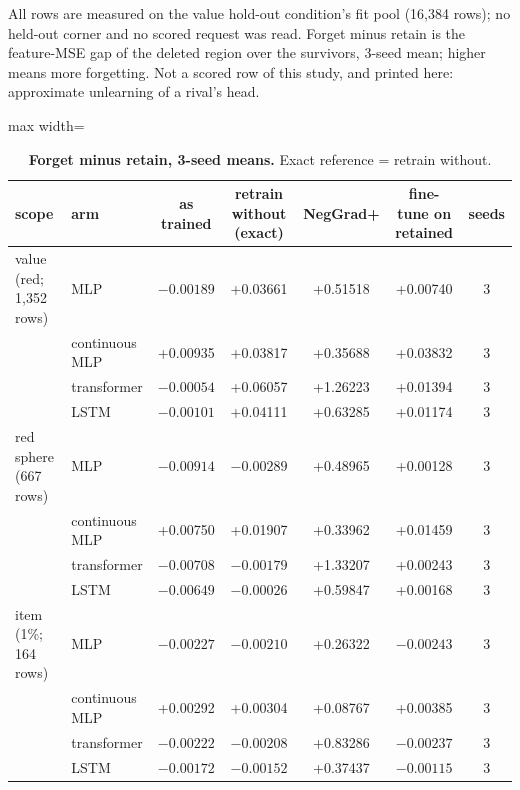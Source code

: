 \documentclass{article} %
\begin{document}
All rows are measured on the value hold-out condition's fit pool (16,384 rows); no held-out corner %
and no scored request was read. Forget minus retain is the feature-MSE gap of the deleted region
over the survivors, 3-seed mean; higher means more forgetting. Not a scored row of this study,
and printed here: approximate unlearning of a rival's head.

\begin{table}[h]
\centering\small
\caption{\textbf{Forget minus retain, 3-seed means.} Exact reference = retrain without.}
\label{tab:unlearn}
\setlength{\tabcolsep}{3pt}
\begin{adjustbox}{max width=\linewidth}\begin{tabular}{llccccc}
\toprule
scope & arm & as trained & retrain without (exact) & NegGrad+ & fine-tune on retained & seeds \\
\midrule
value (red; 1,352 rows) & MLP & $-0.00189$ & +0.03661 & +0.51518 & +0.00740 & 3 \\
 & continuous MLP & +0.00935 & +0.03817 & +0.35688 & +0.03832 & 3 \\
 & transformer & $-0.00054$ & +0.06057 & +1.26223 & +0.01394 & 3 \\
 & LSTM & $-0.00101$ & +0.04111 & +0.63285 & +0.01174 & 3 \\
red sphere (667 rows) & MLP & $-0.00914$ & $-0.00289$ & +0.48965 & +0.00128 & 3 \\
 & continuous MLP & +0.00750 & +0.01907 & +0.33962 & +0.01459 & 3 \\
 & transformer & $-0.00708$ & $-0.00179$ & +1.33207 & +0.00243 & 3 \\
 & LSTM & $-0.00649$ & $-0.00026$ & +0.59847 & +0.00168 & 3 \\
item (1\%; 164 rows) & MLP & $-0.00227$ & $-0.00210$ & +0.26322 & $-0.00243$ & 3 \\
 & continuous MLP & +0.00292 & +0.00304 & +0.08767 & +0.00385 & 3 \\
 & transformer & $-0.00222$ & $-0.00208$ & +0.83286 & $-0.00237$ & 3 \\
 & LSTM & $-0.00172$ & $-0.00152$ & +0.37437 & $-0.00115$ & 3 \\
\bottomrule
\end{tabular}\end{adjustbox}
\end{table}
\end{document}
